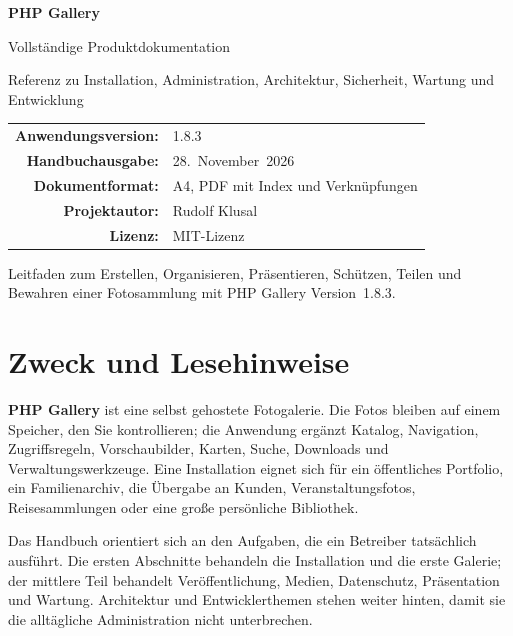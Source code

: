\documentclass[11pt,a4paper]{article}
\newcommand{\version}{1.8.3}
\newcommand{\manualdate}{28.~November~2026}
\newcommand{\product}{\textbf{PHP Gallery}}
\begin{document}
\begin{titlepage}
  \centering
  \vspace*{24mm}
  {\Huge\bfseries\color{GalleryBlue} PHP Gallery\par}
  \vspace{6mm}
  {\LARGE Vollständige Produktdokumentation\par}
  \vspace{14mm}
  {\large Referenz zu Installation, Administration, Architektur, Sicherheit,
  Wartung und Entwicklung\par}
  \vfill
  \begin{tabular}{rl}
    \textbf{Anwendungsversion:} & \version\\
    \textbf{Handbuchausgabe:} & \manualdate\\
    \textbf{Dokumentformat:} & A4, PDF mit Index und Verknüpfungen\\
    \textbf{Projektautor:} & Rudolf Klusal\\
    \textbf{Lizenz:} & MIT-Lizenz\\
  \end{tabular}
  \vfill
  {\small Leitfaden zum Erstellen, Organisieren, Präsentieren, Schützen, Teilen
  und Bewahren einer Fotosammlung mit PHP Gallery Version~\version.\par}
\end{titlepage}

\begingroup
\small
\setlength{\parskip}{0pt}
\tableofcontents
\endgroup
\clearpage
{}

\section{Zweck und Lesehinweise}

\product{} ist eine selbst gehostete Fotogalerie. Die Fotos bleiben auf einem
Speicher, den Sie kontrollieren; die Anwendung ergänzt Katalog, Navigation,
Zugriffsregeln, Vorschaubilder, Karten, Suche, Downloads und
Verwaltungswerkzeuge. Eine Installation eignet sich für ein öffentliches
Portfolio, ein Familienarchiv, die Übergabe an Kunden, Veranstaltungsfotos,
Reisesammlungen oder eine große persönliche Bibliothek.

Das Handbuch orientiert sich an den Aufgaben, die ein Betreiber tatsächlich
ausführt. Die ersten Abschnitte behandeln die Installation und die erste
Galerie; der mittlere Teil behandelt Veröffentlichung, Medien, Datenschutz,
Präsentation und Wartung. Architektur und Entwicklerthemen stehen weiter hinten,
damit sie die alltägliche Administration nicht unterbrechen.
\end{document}
